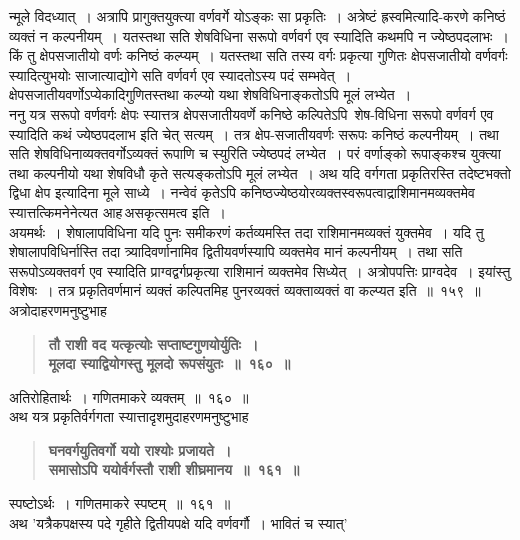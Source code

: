 \documentclass[11pt, openany]{book}
\begin{document}
\newpage

\begin{sloppypar}
\noindent न्मूले विदध्यात्~। अत्रापि प्रागुक्तयुक्त्या वर्णवर्गे योऽङ्कः सा प्रकृतिः~। अत्रेष्टं ह्रस्वमित्यादि-करणे कनिष्ठं व्यक्तं न कल्पनीयम्~। यतस्तथा सति शेषविधिना सरूपो वर्णवर्ग एव स्यादिति कथमपि न ज्येष्ठपदलाभः~। किं तु क्षेपसजातीयो वर्णः कनिष्ठं कल्प्यम्~। यतस्तथा सति तस्य वर्गः प्रकृत्या गुणितः क्षेपसजातीयो वर्णवर्गः स्यादित्युभयोः साजात्याद्योगे सति वर्णवर्ग एव स्यादतोऽस्य पदं सम्भवेत्~। क्षेपसजातीयवर्णोऽप्येकादिगुणितस्तथा कल्प्यो यथा शेषविधिनाङ्कतोऽपि मूलं लभ्येत~।\\

ननु यत्र सरूपो वर्णवर्गः क्षेपः स्यात्तत्र क्षेपसजातीयवर्णे कनिष्ठे कल्पितेऽपि~शेष-विधिना सरूपो वर्णवर्ग एव स्यादिति कथं ज्येष्ठपदलाभ इति चेत् सत्यम्~। तत्र क्षेप-सजातीयवर्णः सरूपः कनिष्ठं कल्पनीयम्~। तथा सति शेषविधिनाव्यक्तवर्गोऽव्यक्तं रूपाणि च स्युरिति ज्येष्ठपदं लभ्येत~। परं वर्णाङ्को रूपाङ्कश्च युक्त्या तथा कल्पनीयो यथा शेषविधौ कृते सत्यङ्कतोऽपि मूलं लभ्येत~। अथ यदि वर्गगता प्रकृतिरस्ति तदेष्टभक्तो द्विधा क्षेप इत्यादिना मूले साध्ये~। नन्वेवं कृतेऽपि कनिष्ठज्येष्ठयोरव्यक्तस्वरूपत्वाद्राशिमानमव्यक्तमेव स्यात्तत्किमनेनेत्यत आह\textendash \,असकृत्समत्व इति~।\\

अयमर्थः~। शेषालापविधिना यदि पुनः समीकरणं कर्तव्यमस्ति तदा राशिमानमव्यक्तं युक्तमेव~। यदि तु शेषालापविधिर्नास्ति तदा त्र्यादिवर्णानामिव द्वितीयवर्णस्यापि व्यक्तमेव मानं कल्पनीयम्~। तथा सति सरूपोऽव्यक्तवर्ग एव स्यादिति प्राग्वद्वर्गप्रकृत्या राशिमानं व्यक्तमेव सिध्येत्~। अत्रोपपत्तिः प्राग्वदेव~। इयांस्तु विशेषः~। तत्र प्रकृतिवर्णमानं व्यक्तं कल्पितमिह पुनरव्यक्तं व्यक्ताव्यक्तं वा कल्प्यत इति~॥~१५९~॥\\

{\small अत्रोदाहरणमनुष्टुभाह\textendash }

 \label{10.160}
\begin{quote}
{\large \textbf{{\color{purple}तौ राशी वद यत्कृत्योः सप्ताष्टगुणयोर्युतिः~।\\
मूलदा स्याद्वियोगस्तु मूलदो रूपसंयुतः~॥~१६०~॥}}}
\end{quote}

अतिरोहितार्थः~। गणितमाकरे व्यक्तम्~॥~१६०~॥\\

{\small अथ यत्र प्रकृतिर्वर्गगता स्यात्तादृशमुदाहरणमनुष्टुभाह\textendash }

 \label{10.161}
\begin{quote}
{\large \textbf{{\color{purple}घनवर्गयुतिवर्गो ययो राश्योः प्रजायते~।\\
समासोऽपि ययोर्वर्गस्तौ राशी शीघ्रमानय~॥~१६१~॥}}}
\end{quote}

स्पष्टोऽर्थः~। गणितमाकरे स्पष्टम्~॥~१६१~॥\\

{\small अथ 'यत्रैकपक्षस्य पदे गृहीते द्वितीयपक्षे यदि वर्णवर्गौ~। भावितं च स्यात्'}
\end{sloppypar}
\end{document}
